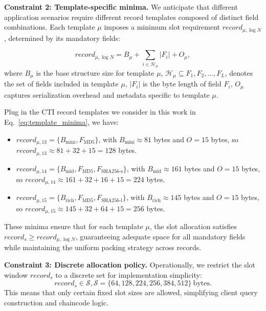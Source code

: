 \documentclass[letterpaper,journal]{IEEEtran}
\begin{document}
\textbf{Constraint 2: Template-specific minima.}
We anticipate that different application scenarios require different record templates composed of distinct field combinations. 
Each template $\mu$ imposes a minimum slot requirement $record_{\mu,\log N}$, determined by its mandatory fields:

\begin{equation}
    \label{eq:template_minima}
    record_{\mu,\log N} = B_\mu + \sum_{i \in \mathcal{H}_\mu} |F_i| + O_\mu,
\end{equation}
where $B_\mu$ is the base structure size for template $\mu$,
$\mathcal{H}_\mu \subseteq {F_1, F_2, \dots, F_L}$, denotes the set of fields included in template $\mu$,
$|F_i|$ is the byte length of field $F_i$,
$O_\mu$ captures serialization overhead and metadata specific to template $\mu$.

Plug in the CTI record templates we consider in this work in Eq.~\eqref{eq:template_minima}, we have:
\begin{itemize}
    \item \( record_{\mu,13} = \{ B_{\text{mini}}, F_{\text{MD5}} \} \), with \( B_{\text{mini}} \approx 81 \) bytes and 
    \( O = 15 \) bytes, so \( record_{\mu,13} \approx 81 + 32 + 15 = 128 \) bytes.
    \item \( record_{\mu,14} = \{ B_{\text{mid}}, F_{\text{MD5}}, F_{\text{SHA256-s}} \} \), with \( B_{\text{mid}} \approx 161 \) bytes and 
    \( O = 15 \) bytes, so \( record_{\mu,14} \approx 161 + 32 + 16 + 15 = 224 \) bytes.
    \item \( record_{\mu,15} = \{ B_{\text{rich}}, F_{\text{MD5}}, F_{\text{SHA256-l}} \} \), with \( B_{\text{rich}} \approx 145 \) bytes and 
    \( O = 15 \) bytes, so \( record_{\mu,15} \approx 145 + 32 + 64 + 15 = 256 \) bytes.
\end{itemize}

These minima ensure that for each template $\mu$, the slot allocation satisfies $record_s \geq record_{\mu,\log N}$, 
guaranteeing adequate space for all mandatory fields while maintaining the uniform packing strategy across records.

\textbf{Constraint 3: Discrete allocation policy.}
Operationally, we restrict the slot window $record_s$ to a discrete set for implementation simplicity:
\begin{equation}
    \label{eq:discrete_allocation}
    record_s \in \mathcal{S},
    \mathcal{S} = \{64, 128, 224, 256, 384, 512\} \ \text{bytes}.
\end{equation}
This means that only certain fixed slot sizes are allowed,
simplifying client query construction and chaincode logic.
\end{document}
